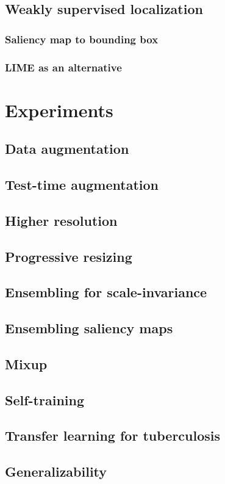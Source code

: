 \documentclass[12pt,twoside,a4paper]{report}
\begin{document}
\section{Weakly supervised localization}
\subsection{Saliency map to bounding box}
\subsection{LIME as an alternative}
\chapter{Experiments\label{exp}}
\section{Data augmentation}
\section{Test-time augmentation}
\section{Higher resolution}
\section{Progressive resizing}
\section{Ensembling for scale-invariance}
\section{Ensembling saliency maps}
\section{Mixup}
\section{Self-training}
\section{Transfer learning for tuberculosis}
\section{Generalizability}
\end{document}
